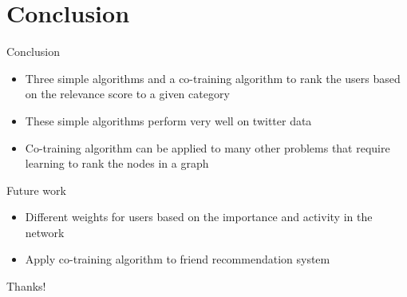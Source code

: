 \documentclass{beamer}
\begin{document}
\section{Conclusion}
\begin{frame}{Conclusion}
\begin{itemize}
\item Three simple algorithms and a co-training algorithm to rank the users based on the relevance score to a given category
\item These simple algorithms perform very well on twitter data
\item Co-training algorithm can be applied to many other problems that require learning to rank the nodes in a graph
\end{itemize}
\begin{block}{Future work}
\begin{itemize}
\item Different weights for users based on the importance and activity in the network
\item Apply co-training algorithm to friend recommendation system
\end{itemize}
\end{block}
\end{frame}

\begin{frame}{}
\begin{center}
{\Huge Thanks!}
\end{center}
\end{frame}
\end{document}
